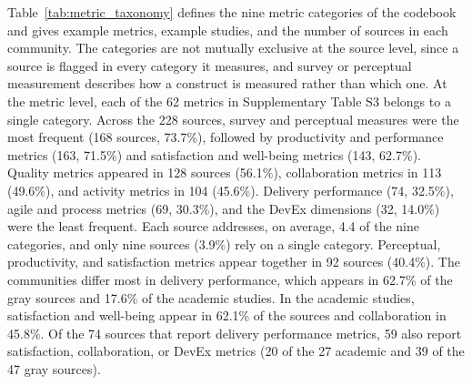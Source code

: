 \documentclass[preprint,number]{elsarticle}
\begin{document}
Table~\ref{tab:metric_taxonomy} defines the nine metric categories of the codebook and gives example metrics, example studies, and the number of sources in each community. The categories are not mutually exclusive at the source level, since a source is flagged in every category it measures, and survey or perceptual measurement describes how a construct is measured rather than which one. At the metric level, each of the 62 metrics in Supplementary Table S3 belongs to a single category. Across the 228 sources, survey and perceptual measures were the most frequent (168 sources, 73.7\%), followed by productivity and performance metrics (163, 71.5\%) and satisfaction and well-being metrics (143, 62.7\%). Quality metrics appeared in 128 sources (56.1\%), collaboration metrics in 113 (49.6\%), and activity metrics in 104 (45.6\%). Delivery performance (74, 32.5\%), agile and process metrics (69, 30.3\%), and the DevEx dimensions (32, 14.0\%) were the least frequent. Each source addresses, on average, 4.4 of the nine categories, and only nine sources (3.9\%) rely on a single category. Perceptual, productivity, and satisfaction metrics appear together in 92 sources (40.4\%). The communities differ most in delivery performance, which appears in 62.7\% of the gray sources and 17.6\% of the academic studies. In the academic studies, satisfaction and well-being appear in 62.1\% of the sources and collaboration in 45.8\%. Of the 74 sources that report delivery performance metrics, 59 also report satisfaction, collaboration, or DevEx metrics (20 of the 27 academic and 39 of the 47 gray sources). %
\end{document}
